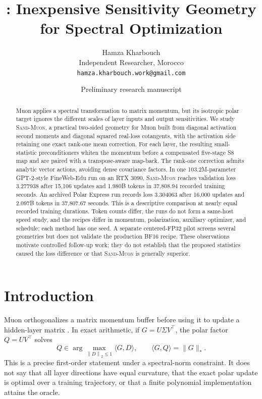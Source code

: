 \documentclass[10pt]{article}
\title{\SAND: Inexpensive Sensitivity Geometry for Spectral Optimization}
\author{Hamza Kharbouch\\Independent Researcher, Morocco\\\texttt{hamza.kharbouch.work@gmail.com}}
\date{Preliminary research manuscript}
\newcommand{\SN}[1]{\left\lVert #1\right\rVert_2}
\newcommand{\SAND}{\textsc{Sand-Muon}\xspace}
\begin{document}
\maketitle

\begin{abstract}
Muon applies a spectral transformation to matrix momentum, but its isotropic polar target ignores the different scales of layer inputs and output sensitivities. We study \SAND, a practical two-sided geometry for Muon built from diagonal activation second moments and diagonal squared real-loss cotangents, with the activation side retaining one exact rank-one mean correction. For each layer, the resulting small-statistic preconditioners whiten the momentum before a compensated five-stage S8 map and are paired with a transpose-aware map-back. The rank-one correction admits analytic vector actions, avoiding dense covariance factors. In one 103.2M-parameter GPT-2-style FineWeb-Edu run on an RTX 3090, \SAND reaches validation loss 3.277938 after 15,106 updates and 1.980B tokens in 37,808.94 recorded training seconds. An archived Polar Express run records loss 3.304063 after 16,000 updates and 2.097B tokens in 37,807.67 seconds. This is a descriptive comparison at nearly equal recorded training durations. Token counts differ, the runs do not form a same-host speed study, and the recipes differ in momentum, polarization, auxiliary optimizer, and schedule; each method has one seed. A separate centered-FP32 pilot screens several geometries but does not validate the production BF16 recipe. These observations motivate controlled follow-up work; they do not establish that the proposed statistics caused the loss difference or that \SAND is generally superior.
\end{abstract}

\section{Introduction}
Muon orthogonalizes a matrix momentum buffer before using it to update a hidden-layer matrix \citep{jordan2024muon,liu2025scalable}. In exact arithmetic, if $G=U\Sigma V^\top$, the polar factor $Q=UV^\top$ solves
\begin{equation}\label{eq:polar-oracle}
 Q\in\arg\max_{\SN{D}\leq 1}\langle G,D\rangle,
 \qquad \langle G,Q\rangle=\|G\|_* .
\end{equation}
This is a precise first-order statement under a spectral-norm constraint. It does not say that all layer directions have equal curvature, that the exact polar update is optimal over a training trajectory, or that a finite polynomial implementation attains the oracle.
\end{document}
